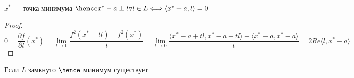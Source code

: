 \begin{example}
\begin{enumerate}
\begin{tikzpicture}[x=0.75pt,y=0.75pt,yscale=-1,xscale=1]
\end{tikzpicture}

\begin{statement}
    $x^* $ --- точка минимума $\hence x^* - a \perp l \forall l \in L \Longleftrightarrow \langle x^* - a , l \rangle = 0 $ 
\end{statement}

\begin{proof}
    \[ 
        0 = \frac{\partial f}{\partial l}(x^*) = \lim_{t \to 0} \frac{f^2(x^* + tl) - f^2(x^*)}{t} = \lim_{t \to 0} \frac{\langle x^* - a + tl, x^* - a + tl \rangle - \langle x^* - a, x^ * - a\rangle}{t}  = 2 Re \langle l, x ^ * - a \rangle
    \]
\end{proof}

\end{enumerate}

\end{example}

\begin{exercise}
    Если $L$ замкнуто $\hence$ минимум существует
\end{exercise}

